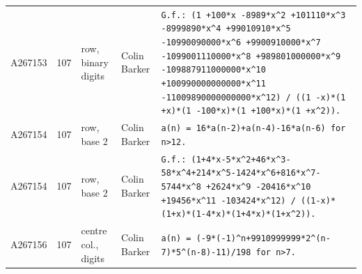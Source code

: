 \documentclass[11pt]{article}
\theoremstyle{definition}
\theoremstyle{remark}
\begin{document}
{\begin{longtable}{p{1.3cm}p{0.7cm}p{2.4cm}p{2.3cm}p{7.3cm}}
A267153 & 107 & row, binary digits & Colin Barker & \texttt{G.f.: \allowbreak{}(1 \allowbreak{}+\allowbreak{}100*\allowbreak{}x \allowbreak{}-\allowbreak{}8989*\allowbreak{}x\^{}2 \allowbreak{}+\allowbreak{}101110*\allowbreak{}x\^{}3 \allowbreak{}-\allowbreak{}8999890*\allowbreak{}x\^{}4 \allowbreak{}+\allowbreak{}99010910*\allowbreak{}x\^{}5 \allowbreak{}-\allowbreak{}10990090000*\allowbreak{}x\^{}6 \allowbreak{}+\allowbreak{}9900910000*\allowbreak{}x\^{}7 \allowbreak{}-\allowbreak{}1099001110000*\allowbreak{}x\^{}8 \allowbreak{}+\allowbreak{}989801000000*\allowbreak{}x\^{}9 \allowbreak{}-\allowbreak{}109887911000000*\allowbreak{}x\^{}10 \allowbreak{}+\allowbreak{}100990000000000*\allowbreak{}x\^{}11 \allowbreak{}-\allowbreak{}11009890000000000*\allowbreak{}x\^{}12)\allowbreak{} \allowbreak{}/\allowbreak{} \allowbreak{}((1 \allowbreak{}-\allowbreak{}x)\allowbreak{}*\allowbreak{}(1 \allowbreak{}+\allowbreak{}x)\allowbreak{}*\allowbreak{}(1 \allowbreak{}-\allowbreak{}100*\allowbreak{}x)\allowbreak{}*\allowbreak{}(1 \allowbreak{}+\allowbreak{}100*\allowbreak{}x)\allowbreak{}*\allowbreak{}(1 \allowbreak{}+\allowbreak{}x\^{}2)\allowbreak{})\allowbreak{}.} \\
A267154 & 107 & row, base 2 & Colin Barker & \texttt{a(n)\allowbreak{} \allowbreak{}=\allowbreak{} \allowbreak{}16*\allowbreak{}a(n-\allowbreak{}2)\allowbreak{}+\allowbreak{}a(n-\allowbreak{}4)\allowbreak{}-\allowbreak{}16*\allowbreak{}a(n-\allowbreak{}6)\allowbreak{} \allowbreak{}for \allowbreak{}n>12.} \\
A267154 & 107 & row, base 2 & Colin Barker & \texttt{G.f.: \allowbreak{}(1+\allowbreak{}4*\allowbreak{}x-\allowbreak{}5*\allowbreak{}x\^{}2+\allowbreak{}46*\allowbreak{}x\^{}3-\allowbreak{}58*\allowbreak{}x\^{}4+\allowbreak{}214*\allowbreak{}x\^{}5-\allowbreak{}1424*\allowbreak{}x\^{}6+\allowbreak{}816*\allowbreak{}x\^{}7-\allowbreak{}5744*\allowbreak{}x\^{}8 \allowbreak{}+\allowbreak{}2624*\allowbreak{}x\^{}9 \allowbreak{}-\allowbreak{}20416*\allowbreak{}x\^{}10 \allowbreak{}+\allowbreak{}19456*\allowbreak{}x\^{}11 \allowbreak{}-\allowbreak{}103424*\allowbreak{}x\^{}12)\allowbreak{} \allowbreak{}/\allowbreak{} \allowbreak{}((1-\allowbreak{}x)\allowbreak{}*\allowbreak{}(1+\allowbreak{}x)\allowbreak{}*\allowbreak{}(1-\allowbreak{}4*\allowbreak{}x)\allowbreak{}*\allowbreak{}(1+\allowbreak{}4*\allowbreak{}x)\allowbreak{}*\allowbreak{}(1+\allowbreak{}x\^{}2)\allowbreak{})\allowbreak{}.} \\
A267156 & 107 & centre col., digits & Colin Barker & \texttt{a(n)\allowbreak{} \allowbreak{}=\allowbreak{} \allowbreak{}(-\allowbreak{}9*\allowbreak{}(-\allowbreak{}1)\allowbreak{}\^{}n+\allowbreak{}9910999999*\allowbreak{}2\^{}(n-\allowbreak{}7)\allowbreak{}*\allowbreak{}5\^{}(n-\allowbreak{}8)\allowbreak{}-\allowbreak{}11)\allowbreak{}/\allowbreak{}198 \allowbreak{}for \allowbreak{}n>7.} \\

\end{longtable}}
\end{document}

